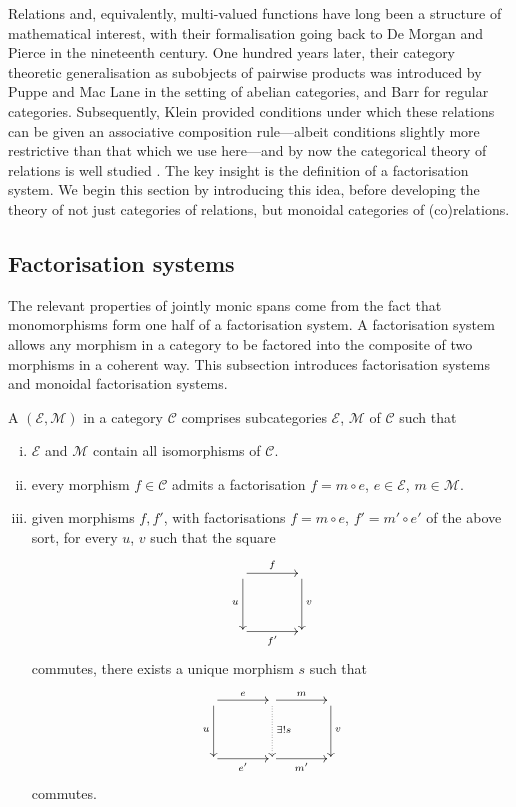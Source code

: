 Relations and, equivalently, multi-valued functions have long been a structure
of mathematical interest, with their formalisation going back to De Morgan
\cite{DeM60} and Pierce \cite{Pie70} in the nineteenth century. One hundred
years later, their category theoretic generalisation as subobjects of pairwise
products was introduced by Puppe \cite{Pup62} and Mac Lane \cite{Mac63a} in the
setting of abelian categories, and Barr \cite{Bar70} for regular categories.
Subsequently, Klein \cite{Kle70} provided conditions under which these relations
can be given an associative composition rule---albeit conditions slightly more
restrictive than that which we use here---and by now the categorical theory of
relations is well studied \cite{FS90, Mil00, JW00}.  The key insight is the
definition of a factorisation system. We begin this section by introducing this
idea, before developing the theory of not just categories of relations, but
monoidal categories of (co)relations.

\subsection{Factorisation systems}
The relevant properties of jointly monic spans come from the fact that
monomorphisms form one half of a factorisation system. A factorisation system
allows any morphism in a category to be factored into the composite of two
morphisms in a coherent way. This subsection introduces factorisation systems
and monoidal factorisation systems.

\begin{definition}
  A  $(\mathcal E,\mathcal M)$ in a category
  $\mathcal C$ comprises subcategories $\mathcal E$, $\mathcal M$ of $\mathcal
  C$ such that
  \begin{enumerate}[(i)]
    \item $\mathcal E$ and $\mathcal M$ contain all isomorphisms of $\mathcal
      C$.
    \item  every morphism $f \in \mathcal C$ admits a factorisation $f=m \circ
      e$, $e \in \mathcal E$, $m \in \mathcal M$.
\item given morphisms $f,f'$, with factorisations $f = m \circ e$, $f' = m' \circ
  e'$ of the above sort, for every $u$, $v$ such that the square
  \[
    \xymatrixcolsep{3pc}
    \xymatrixrowsep{3pc}
    \xymatrix{
       \ar[r]^f \ar[d]_u &  \ar[d]^v \\
       \ar[r]_{f'} & 
    }
  \]
  commutes, there exists a unique morphism $s$ such that
  \[
    \xymatrixcolsep{3pc}
    \xymatrixrowsep{3pc}
    \xymatrix{
      \ar[r]^e \ar[d]_u & \ar[r]^m \ar@{.>}[d]^{\exists! s} &  \ar[d]^v \\
       \ar[r]_{e'}& \ar[r]_{m'} & 
    }
  \]
  commutes.
  \end{enumerate}
\end{definition}

